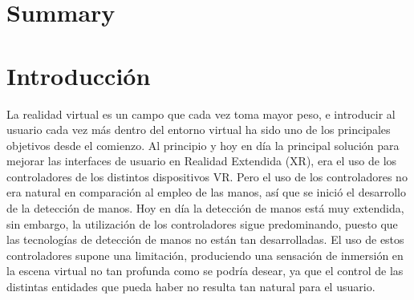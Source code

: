 \documentclass[a4paper, 12pt]{book}
\begin{document}

\chapter*{Summary}



\tableofcontents
\cleardoublepage
\listoffigures %



\cleardoublepage
\chapter{Introducción}
\label{sec:intro} %
La realidad virtual es un campo que cada vez toma mayor peso, e introducir al usuario cada vez más dentro del entorno virtual ha sido uno de los principales objetivos desde el comienzo. Al principio y hoy en día la principal 
solución para mejorar las interfaces de usuario en Realidad Extendida (XR), era el uso de los controladores de los distintos dispositivos VR. Pero el uso de los controladores no era natural en comparación al empleo de las manos, así que se inició el desarrollo de la detección de manos. Hoy en 
día la detección de manos está muy extendida, sin embargo, la utilización de los controladores sigue predominando, puesto que las tecnologías de detección de manos no están tan desarrolladas. El uso de estos controladores supone una limitación, produciendo una sensación de inmersión en la escena virtual no tan profunda como se podría desear, ya que 
el control de las distintas entidades que pueda haber no resulta tan natural para el usuario.  
\end{document}
